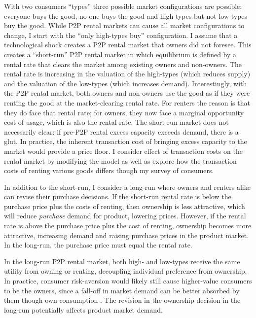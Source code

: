 \documentclass[11pt]{article}
\begin{document}
With two consumers ``types'' three possible market configurations are possible: 
everyone buys the good, no one buys the good and high types but not low types buy the good.  
While P2P rental markets can cause all market configurations to change, I start with the ``only high-types buy'' configuration. 
I assume that a technological shock creates a P2P rental market that owners did not foresee. 
This creates a ``short-run'' P2P rental market in which equilibrium is defined by a rental rate that clears the market among existing owners and non-owners. 
The rental rate is increasing in the valuation of the high-types (which reduces supply) and the valuation of the low-types (which increases demand). 
Interestingly, with the P2P rental market, both owners and non-owners use the good as if they were renting the good at the market-clearing rental rate. 
For renters the reason is that they do face that rental rate; 
for owners, they now face a marginal opportunity cost of usage, which is also the rental rate. 
The short-run market does not necessarily clear: if pre-P2P rental excess capacity exceeds demand, there is a glut. 
In practice, the inherent transaction cost of bringing excess capacity to the market would provide a price floor.     
I consider effect of transaction costs on the rental market by modifying the model as well as explore how the transaction costs of renting various goods differs though my survey of consumers. 

In addition to the short-run, I consider a long-run where owners and renters alike can revise their purchase decisions. 
If the short-run rental rate is below the purchase price plus the costs of renting, then ownership is less attractive, which will reduce \emph{purchase} demand for product, lowering prices. 
However, if the rental rate is above the purchase price plus the cost of renting, ownership becomes more attractive, increasing demand and raising purchase prices in the product market. 
In the long-run, the purchase price must equal the rental rate.  

In the long-run P2P rental market, both high- and low-types receive the same utility from owning or renting, decoupling individual preference from ownership. 
In practice, consumer risk-aversion would likely still cause higher-value consumers to be the owners, since a fall-off in market demand can be better absorbed by them though own-consumption \citep{sinai2005}. 
The revision in the ownership decision in the long-run potentially affects product market demand. 
\end{document}

